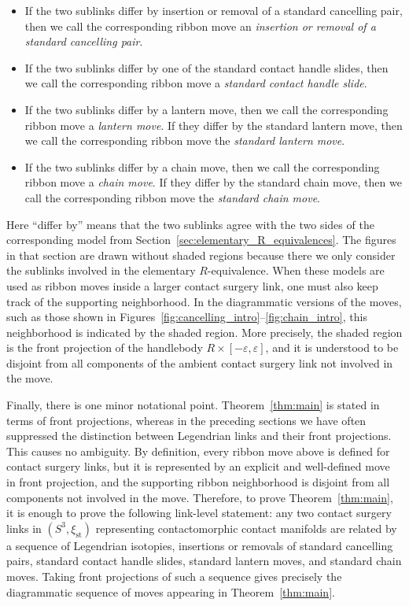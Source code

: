 \documentclass{amsart}
\numberwithin{equation}{section}
\numberwithin{figure}{section}
\theoremstyle{definition}
\theoremstyle{remark}
\let\olddxi\xi %
\renewcommand{\xi}{\olddxi}
\newcommand{\xist}{\olddxi_{\mathrm{st}}}
\begin{document}
\begin{itemize}
    \item If the two sublinks differ by insertion or removal of a standard cancelling pair, then we call the corresponding ribbon move an \emph{insertion or removal of a standard cancelling pair}.

    \item If the two sublinks differ by one of the standard contact handle slides, then we call the corresponding ribbon move a \emph{standard contact handle slide}.

    \item If the two sublinks differ by a lantern move, then we call the corresponding ribbon move a \emph{lantern move}. If they differ by the standard lantern move, then we call the corresponding ribbon move the \emph{standard lantern move}.

    \item If the two sublinks differ by a chain move, then we call the corresponding ribbon move a \emph{chain move}. If they differ by the standard chain move, then we call the corresponding ribbon move the \emph{standard chain move}.
\end{itemize}

Here ``differ by'' means that the two sublinks agree with the two sides of the corresponding model from Section~\ref{sec:elementary_R_equivalences}. The figures in that section are drawn without shaded regions because there we only consider the sublinks involved in the elementary \(R\)-equivalence. When these models are used as ribbon moves inside a larger contact surgery link, one must also keep track of the supporting neighborhood. In the diagrammatic versions of the moves, such as those shown in Figures~\ref{fig:cancelling_intro}--\ref{fig:chain_intro}, this neighborhood is indicated by the shaded region. More precisely, the shaded region is the front projection of the handlebody $R\times[-\varepsilon,\varepsilon]$, and it is understood to be disjoint from all components of the ambient contact surgery link not involved in the move.


Finally, there is one minor notational point. Theorem~\ref{thm:main} is stated in terms of front projections, whereas in the preceding sections we have often suppressed the distinction between Legendrian links and their front projections. This causes no ambiguity. By definition, every ribbon move above is defined for contact surgery links, but it is represented by an explicit and well-defined move in front projection, and the supporting ribbon neighborhood is disjoint from all components not involved in the move. Therefore, to prove Theorem~\ref{thm:main}, it is enough to prove the following link-level statement: any two contact surgery links in \((S^3,\xist)\) representing contactomorphic contact manifolds are related by a sequence of Legendrian isotopies, insertions or removals of standard cancelling pairs, standard contact handle slides, standard lantern moves, and standard chain moves. Taking front projections of such a sequence gives precisely the diagrammatic sequence of moves appearing in Theorem~\ref{thm:main}.
\end{document}
